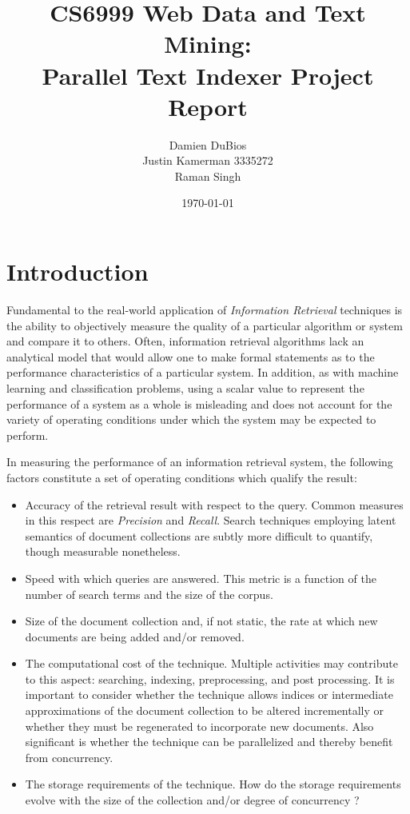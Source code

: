 \documentclass[10pt]{report}
\title{CS6999 Web Data and Text Mining:\\Parallel Text Indexer Project Report}
\author{Damien DuBios\\Justin Kamerman 3335272\\Raman Singh}
\date{\today}
\begin{document}
\maketitle
\renewcommand*\thesection{\arabic{section}}

\section{Introduction}
Fundamental to the real-world application of \textit{Information
  Retrieval} techniques is the ability to objectively measure the
quality of a particular algorithm or system and compare it to
others. Often, information retrieval algorithms lack an analytical
model that would allow one to make formal statements as to the
performance characteristics of a particular system. In addition, as with
machine learning and classification problems, using
a scalar value to represent the performance of a system as a whole is
misleading and does not account for the variety of operating
conditions under which the system may be expected to perform.

In measuring the performance of an information retrieval system, the
following factors constitute a set of operating conditions which
qualify the result:

\begin{itemize}
  \item Accuracy of the retrieval result with respect to the
    query. Common measures in this respect are \textit{Precision} and
    \textit{Recall}. Search techniques employing latent semantics of
    document collections are subtly more difficult to quantify, though
    measurable nonetheless.

    \item Speed with which queries are answered. This metric is a
      function of the number of search terms and the size of the
      corpus.

    \item Size of the document collection and, if not static, the rate
      at which new documents are being added and/or removed.
    

    \item The computational cost of the technique. Multiple
      activities may contribute to this aspect: searching, indexing,
      preprocessing, and post processing. It is important to consider
      whether the technique allows indices or intermediate
      approximations of the document collection to be altered
      incrementally or whether they must be regenerated to incorporate
      new documents. Also significant is whether the technique can be
      parallelized and thereby benefit from concurrency.

    \item The storage requirements of the technique. How do the
      storage requirements evolve with the size of the collection
      and/or degree of concurrency ?
\end{itemize}
\end{document}
